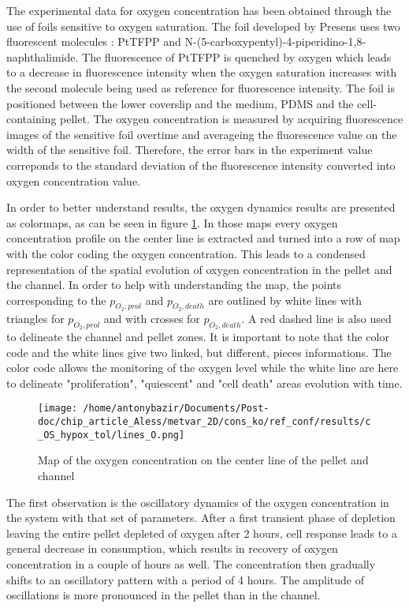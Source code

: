 \documentclass[11pt,a4paper]{article}
\begin{document}
The experimental data for oxygen concentration has been obtained through the use of foils sensitive to oxygen saturation. The foil developed by Presens uses two fluorescent molecules : PtTFPP and N-(5-carboxypentyl)-4-piperidino-1,8-naphthalimide. The fluorescence of PtTFPP is quenched by oxygen which leads to a decrease in fluorescence intensity when the oxygen saturation increases with the second molecule being used as reference for fluorescence intensity. The foil is positioned between the lower coverslip and the medium, PDMS and the cell-containing pellet. The oxygen concentration is measured by acquiring fluorescence images of the sensitive foil overtime and averageing the fluorescence value on the width of the sensitive foil. Therefore, the error bars in the experiment value correponds to the standard deviation of the fluorescence intensity converted into oxygen concentration value. %

In order to better understand results, the oxygen dynamics results are presented as colormaps, as can be seen in figure \ref{ref_map}. In those maps every oxygen concentration profile on the center line is extracted and turned into a row of map with the color coding the oxygen concentration. This leads to a condensed representation of the spatial evolution of oxygen concentration in the pellet and the channel. In order to help with understanding the map, the points corresponding to the $p_{O_2,prol}$ and $p_{O_2,death}$ are outlined by white lines with triangles for  $p_{O_2,prol}$ and with crosses for $p_{O_2,death}$. A red dashed line is also used to delineate the channel and pellet zones.  It is important to note that the color code and the white lines give two linked, but different, pieces informations. The color code allows the monitoring of the oxygen level while the white line are here to delineate "proliferation", "quiescent" and "cell death" areas evolution with time. 

\begin{figure}[ht!]
\centering
\texttt{[image: /home/antonybazir/Documents/Post-doc/chip\_article\_Aless/metvar\_2D/cons\_ko/ref\_conf/results/c\_OS\_hypox\_tol/lines\_O.png]}
\caption{ Map of the oxygen concentration on the center line of the pellet and channel  \label{ref_map}}
\end{figure}

The first observation is the oscillatory dynamics of the oxygen concentration in the system with that set of parameters. After a first transient phase of depletion leaving the entire pellet depleted of oxygen after 2 hours, cell response leads to a general decrease in consumption, which results in recovery of oxygen concentration in a couple of hours as well. The concentration then gradually shifts to an oscillatory pattern with a period of 4 hours. The amplitude of oscillations is more pronounced in the pellet than in the channel.
\end{document}

